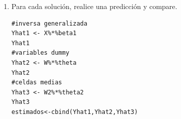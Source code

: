 \documentclass[10pt,a4paper]{report}
\begin{document}
\begin{enumerate}
$\hat{\theta}= L\hat{\beta}=\begin{bmatrix}
\mu+\alpha_{1}+\beta_{1}+\gamma_{11}\\
-\alpha_{1}+\alpha_{2}-\gamma_{11}+\gamma_{21}\\
-\alpha_{1}+\alpha_{3}-\gamma_{11}+\gamma_{31}\\
-\alpha_{1}+\alpha_{4}-\gamma_{11}+\gamma_{41}\\
-\beta_{1}+\beta_{2}-\gamma_{11}+\gamma_{12}\\
-\beta_{1}+\beta_{3}-\gamma_{11}+\gamma_{13}\\
-\beta_{1}+\beta_{4}-\gamma_{11}+\gamma_{14}\\
-\beta_{1}+\beta_{5}-\gamma_{11}+\gamma_{15}\\
\gamma_{11}-\gamma_{12}-\gamma_{21}+\gamma_{22}\\
\gamma_{11}-\gamma_{12}-\gamma_{31}+\gamma_{32}\\
\gamma_{11}-\gamma_{12}-\gamma_{41}+\gamma_{42}\\
\gamma_{11}-\gamma_{13}-\gamma_{21}+\gamma_{23}\\
\gamma_{11}-\gamma_{13}-\gamma_{31}+\gamma_{33}\\
\gamma_{11}-\gamma_{13}-\gamma_{41}+\gamma_{43}\\
\gamma_{11}-\gamma_{14}-\gamma_{21}+\gamma_{24}\\
\gamma_{11}-\gamma_{14}-\gamma_{31}+\gamma_{34}\\
\gamma_{11}-\gamma_{14}-\gamma_{41}+\gamma_{44}\\
\gamma_{11}-\gamma_{15}-\gamma_{21}+\gamma_{25}\\
\gamma_{11}-\gamma_{15}-\gamma_{31}+\gamma_{35}\\
\gamma_{11}-\gamma_{15}-\gamma_{41}+\gamma_{45}\\
\end{bmatrix}$
    \item[8.] Para cada solución, realice una predicción y compare.

\begin{verbatim}
#inversa generalizada
Yhat1 <- X%*%beta1
Yhat1
#variables dummy
Yhat2 <- W%*%theta
Yhat2
#celdas medias
Yhat3 <- W2%*%theta2
Yhat3
estimados<-cbind(Yhat1,Yhat2,Yhat3)
\end{verbatim}


\end{enumerate}
\end{document}
